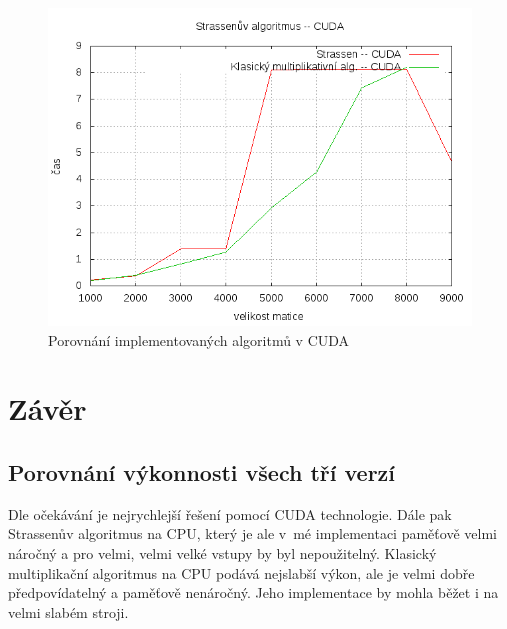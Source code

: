 \documentclass[12pt,a4paper]{article}
\begin{document}
\begin{figure}[h]
\includegraphics[width=\textwidth]{graph/cuda2/cuda-strassen.png}
\caption{Porovnání implementovaných algoritmů v CUDA}
\label{cuda-strassen}
\end{figure}


\pagebreak
\section{Závěr}

\subsection{Porovnání výkonnosti všech tří verzí}

Dle očekávání je nejrychlejší řešení pomocí CUDA technologie. Dále pak Strassenův algoritmus na CPU, který je ale v~mé implementaci paměťově velmi náročný a pro velmi, velmi velké vstupy by byl nepoužitelný. Klasický multiplikační algoritmus na CPU podává nejslabší výkon, ale je velmi dobře předpovídatelný a paměťově nenáročný. Jeho implementace by mohla běžet i na velmi slabém stroji.
\end{document}
